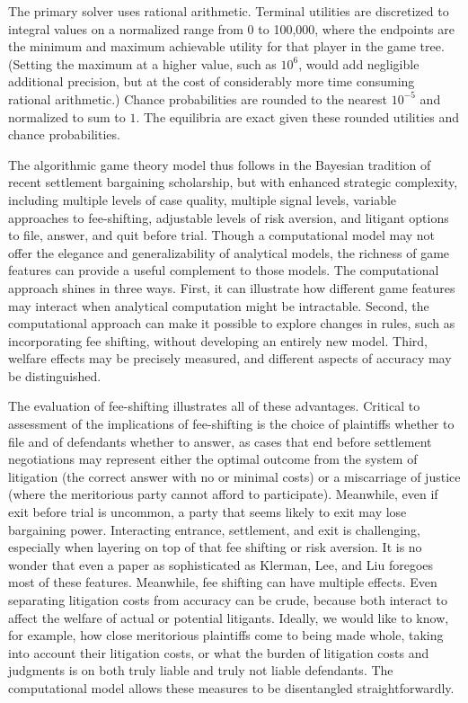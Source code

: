 \documentclass{article}
\begin{document}
The primary solver uses rational arithmetic. Terminal utilities are discretized to integral values on a normalized range from 0 to 100,000, where the endpoints are the minimum and maximum achievable utility for that player in the game tree. (Setting the maximum at a higher value, such as $10^6$, would add negligible additional precision, but at the cost of considerably more time consuming rational arithmetic.)  Chance probabilities are rounded to the nearest $10^{-5}$ and normalized to sum to $1$. The equilibria are exact given these rounded utilities and chance probabilities.

The algorithmic game theory model thus follows in the Bayesian tradition of recent settlement bargaining scholarship, but with enhanced strategic complexity, including multiple levels of case quality, multiple signal levels, variable approaches to fee-shifting, adjustable levels of risk aversion, and litigant options to file, answer, and quit before trial. Though a computational model may not offer the elegance and generalizability of analytical models, the richness of game features can provide a useful complement to those models. The computational approach shines in three ways. First, it can illustrate how different game features may interact when analytical computation might be intractable. Second, the computational approach can make it possible to explore changes in rules, such as incorporating fee shifting, without developing an entirely new model. Third, welfare effects may be precisely measured, and different aspects of accuracy may be distinguished. 

The evaluation of fee-shifting illustrates all of these advantages. Critical to assessment of the implications of fee-shifting is the choice of plaintiffs whether to file and of defendants whether to answer, as cases that end before settlement negotiations may represent either the optimal outcome from the system of litigation (the correct answer with no or minimal costs) or a miscarriage of justice (where the meritorious party cannot afford to participate). Meanwhile, even if exit before trial is uncommon, a party that seems likely to exit may lose bargaining power. Interacting entrance, settlement, and exit is challenging, especially when layering on top of that fee shifting or risk aversion. It is no wonder that even a paper as sophisticated as Klerman, Lee, and Liu foregoes most of these features. Meanwhile, fee shifting can have multiple effects. Even separating litigation costs from accuracy can be crude, because both interact to affect the welfare of actual or potential litigants. Ideally, we would like to know, for example, how close meritorious plaintiffs come to being made whole, taking into account their litigation costs, or what the burden of litigation costs and judgments is on both truly liable and truly not liable defendants. The computational model allows these measures to be disentangled straightforwardly. 
\end{document}

